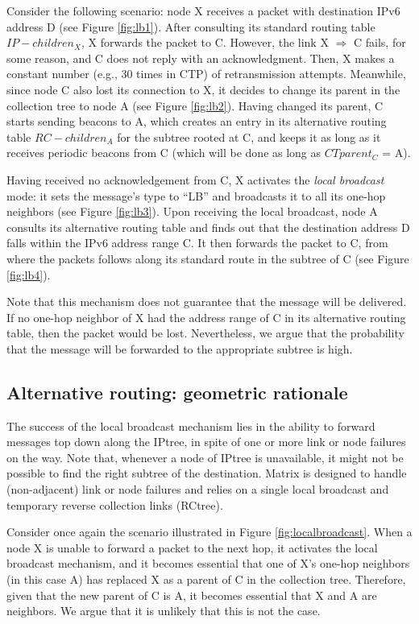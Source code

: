 Consider the following scenario: node X receives a packet with destination IPv6
address D (see Figure \ref{fig:lb1}). After consulting its standard routing
table $IP-children_X$, X forwards the packet to C. However, the link X
$\Rightarrow$ C fails, for some reason, and C does not reply with an
acknowledgment.
Then, X makes a constant number (e.g., 30 times in CTP) of retransmission
attempts. Meanwhile, since node C also lost its connection to X, it decides to
change its parent in the collection tree to node A (see Figure \ref{fig:lb2}).
Having changed its parent, C starts sending beacons to A, which creates an entry
in its alternative routing table $RC-children_A$ for the subtree rooted at C, and
keeps it as long as it receives periodic beacons from C (which will be done as long as $CTparent_C$ = A).

Having received no acknowledgement from C, X activates the \textit{local
broadcast} mode: it sets the message's type to ``LB'' and broadcasts
it to all its one-hop neighbors (see Figure \ref{fig:lb3}). Upon
receiving the local broadcast, node A consults its alternative
routing table and finds out that the destination address D falls
within the IPv6 address range C. It then forwards the packet to C,
from where the packets follows along its standard route in the
subtree of C (see Figure \ref{fig:lb4}).

Note that this
mechanism does not guarantee that the message will be delivered. If no one-hop
neighbor of X had the address range of C in its alternative routing table, then
the packet would be lost. Nevertheless, we argue that the probability that the
message will be forwarded to the appropriate subtree is high.

\subsection{Alternative routing: geometric rationale}

The success of the local broadcast mechanism lies in the ability to forward
messages top down along the IPtree, in spite of one or more link or node
failures on the way.
Note that, whenever a node of IPtree is unavailable, it
might not be possible to find the right subtree of the destination.
Matrix is designed to handle (non-adjacent) link or node failures and relies on
a single local broadcast and temporary reverse collection links (RCtree).

Consider once again the scenario illustrated in Figure \ref{fig:localbroadcast}.
When a node X is unable to forward a packet to the next hop, it activates the
local broadcast mechanism, and it becomes essential that one of X's one-hop
neighbors (in this case A) has replaced X as a parent of C in
the collection tree. Therefore, given that the new parent of C is A, it becomes
essential that X and A are neighbors. We argue that it is unlikely that this is not the case.

